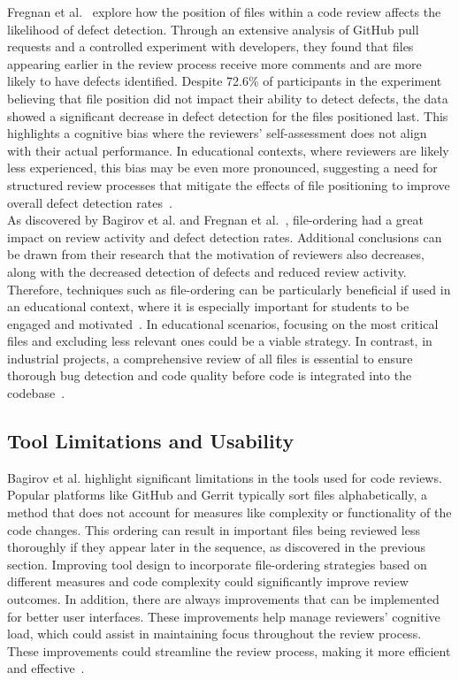 Fregnan et al.~\cite{Fregnan_2022} explore how the position of files within a code review affects the likelihood of defect detection. Through an extensive analysis of GitHub pull requests and a controlled experiment with developers, they found that files appearing earlier in the review process receive more comments and are more likely to have defects identified. Despite 72.6\% of participants in the experiment believing that file position did not impact their ability to detect defects, the data showed a significant decrease in defect detection for the files positioned last. This highlights a cognitive bias where the reviewers' self-assessment does not align with their actual performance. In educational contexts, where reviewers are likely less experienced, this bias may be even more pronounced, suggesting a need for structured review processes that mitigate the effects of file positioning to improve overall defect detection rates~\cite{Fregnan_2022}. \\

As discovered by Bagirov et al. and Fregnan et al.~\cite{Bagirov_2023, Fregnan_2022}, file-ordering had a great impact on review activity and defect detection rates. Additional conclusions can be drawn from their research that the motivation of reviewers also decreases, along with the decreased detection of defects and reduced review activity. Therefore, techniques such as file-ordering can be particularly beneficial if used in an educational context, where it is especially important for students to be engaged and motivated~\cite{Indriasari_Luxton_2020}. In educational scenarios, focusing on the most critical files and excluding less relevant ones could be a viable strategy. In contrast, in industrial projects, a comprehensive review of all files is essential to ensure thorough bug detection and code quality before code is integrated into the codebase~\cite{Bagirov_2023}. \\


\subsection{Tool Limitations and Usability}
Bagirov et al.\cite{Bagirov_2023} highlight significant limitations in the tools used for code reviews. Popular platforms like GitHub and Gerrit typically sort files alphabetically, a method that does not account for measures like complexity or functionality of the code changes. This ordering can result in important files being reviewed less thoroughly if they appear later in the sequence, as discovered in the previous section. Improving tool design to incorporate file-ordering strategies based on different measures and code complexity could significantly improve review outcomes. In addition, there are always improvements that can be implemented for better user interfaces. These improvements help manage reviewers' cognitive load, which could assist in maintaining focus throughout the review process. These improvements could streamline the review process, making it more efficient and effective~\cite{Bagirov_2023}. \\

